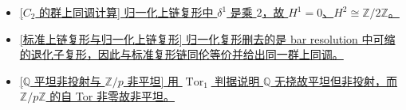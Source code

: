 \documentclass[a4paper]{ctexart}
\theoremstyle{definition}
\theoremstyle{analysis}
\theoremstyle{plain}
\begin{document}
\begin{itemize}
  \item \hyperref[subsec:problem-c2-cohomology-cochains]{[\(C_2\) 的群上同调计算] 归一化上链复形中 \(\delta^1\) 是乘 \(2\)，故 \(H^1=0\)、\(H^2\cong\mathbb Z/2\mathbb Z\)。}
  \item \hyperref[subsec:problem-normalized-cochain-homotopy]{[标准上链复形与归一化上链复形] 归一化复形删去的是 bar resolution 中可缩的退化子复形，因此与标准复形链同伦等价并给出同一群上同调。}
  \item \hyperref[subsec:problem-q-flat-not-projective]{[\(\mathbb Q\) 平坦非投射与 \(\mathbb Z/p\) 非平坦] 用 \(\operatorname{Tor}_1\) 判据说明 \(\mathbb Q\) 无挠故平坦但非投射，而 \(\mathbb Z/p\mathbb Z\) 的自 Tor 非零故非平坦。}
\end{itemize}
\end{document}
